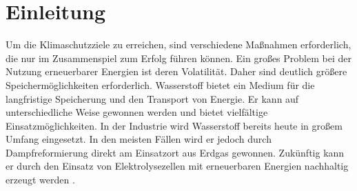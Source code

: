 \chapter{Einleitung}
Um die Klimaschutzziele zu erreichen, sind verschiedene Maßnahmen erforderlich, die nur im Zusammenspiel zum Erfolg führen können. Ein großes Problem bei der Nutzung erneuerbarer Energien ist deren Volatilität. Daher sind deutlich größere Speichermöglichkeiten erforderlich. Wasserstoff bietet ein Medium für die langfristige Speicherung und den Transport von Energie. Er kann auf unterschiedliche Weise gewonnen werden und bietet vielfältige Einsatzmöglichkeiten. In der Industrie wird Wasserstoff bereits heute in großem Umfang eingesetzt. In den meisten Fällen wird er jedoch durch Dampfreformierung direkt am Einsatzort aus Erdgas gewonnen. Zukünftig kann er durch den Einsatz von Elektrolysezellen mit erneuerbaren Energien nachhaltig erzeugt werden \cite{Elektrolyse}. 
